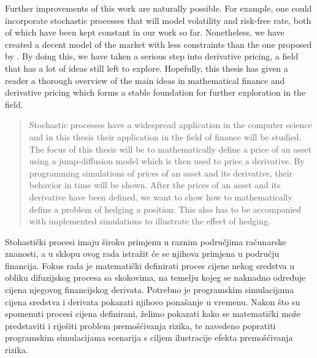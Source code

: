 \documentclass[times, utf8, diplomski]{fer}
\begin{document}
Further improvements of this work are naturally possible. For example, one could incorporate stochastic processes that will model volatility and risk-free rate, both of which have been kept constant in our work so far. Nonetheless, we have created a decent model of the market with less constraints than the one proposed by \cite{black_pricing_1972}. By doing this, we have taken a serious step into derivative pricing, a field that has a lot of ideas still left to explore. Hopefully, this thesis has given a reader a thorough overview of the main ideas in mathematical finance and derivative pricing which forms a stable foundation for further exploration in the field. 



\nocite{*}

\listoffigures

\newpage
\begin{abstract}
Stochastic processes have a widespread application in the computer science and in this thesis their application in the field of finance will be studied. The focus of this thesis will be to mathematically define a price of an asset using a jump-diffusion model which is then used to price a derivative. By programming simulations of prices of an asset and its derivative, their behavior in time will be shown. After the prices of an asset and its derivative have been defined, we want to show how to mathematically define a problem of hedging a position. This also has to be accompanied with implemented simulations to illustrate the effect of hedging.

\end{abstract}

\begin{sazetak}
Stohastički procesi imaju široku primjenu u raznim područjima računarske znanosti, a u sklopu ovog rada istražit će se njihova primjena u području financija. Fokus rada je matematički definirati proces cijene nekog sredstva u obliku difuzijskog procesa sa skokovima, na temelju kojeg se naknadno određuje cijena njegovog financijskog derivata. Potrebno je programskim simulacijama cijena sredstva i derivata pokazati njihovo ponašanje u vremenu. Nakon što su spomenuti procesi cijena definirani, želimo pokazati kako se matematički može predstaviti i riješiti problem premošćivanja rizika, te navedeno popratiti programskim simulacijama scenarija s ciljem ilustracije efekta premošćivanja rizika.

\end{sazetak}
\end{document}
